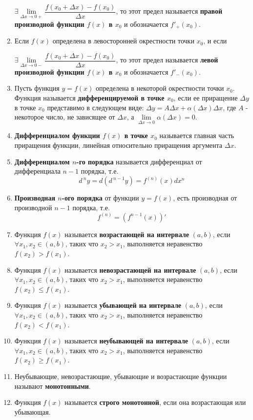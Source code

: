 \begin{enumerate}
$\exists \lim\limits_{\Delta x \to 0+}{\dfrac{f(x_0+\Delta x) - f(x_0)}{\Delta x}}$, то этот предел называется \textbf{правой производной функции $f(x)$ в $x_0$} и обозначается $f'_+(x_0)$.
\item Если $f(x)$ определена в левосторонней окрестности точки $x_0$, и если

$\exists \lim\limits_{\Delta x \to 0-}{\dfrac{f(x_0+\Delta x) - f(x_0)}{\Delta x}}$, то этот предел называется \textbf{левой производной функции $f(x)$ в $x_0$} и обозначается $f'_-(x_0)$.
\item Пусть функция $y = f(x)$ определена в некоторой окрестности точки $x_0$. Функция называется \textbf{дифференцируемой в точке $x_0$}, если ее приращение $\Delta y$ в точке $x_0$ представимо в следующем виде: $\Delta y = A\Delta x + \alpha(\Delta x)\Delta x$, где $A$ - некоторое число, не зависящее от $\Delta x$, а $\lim\limits_{\Delta x \to 0}\alpha(\Delta x) = 0$.
\item \textbf{Дифференциалом функции $f(x)$ в точке $x_0$} называется главная часть приращения функции, линейная относительно приращения аргумента $\Delta x$.
\item \textbf{Дифференциалом $n$-го порядка} называется дифференциал от дифференциала $n-1$ порядка, т.е. $$d^{\ n}y = d(d^{\ n-1}y) = f^{(n)}(x)dx^n$$
\item \textbf{Производная $n$-ого порядка} от функции $y = f(x)$, есть производная от производной $n-1$ порядка, т.е. $$f^{(n)} = (f^{n-1}(x))'$$
\item Функция $f(x)$ называется \textbf{возрастающей на интервале} $(a, b)$, если $\forall x_1, x_2 \in (a, b)$, таких что $x_2 > x_1$, выполняется неравенство $f(x_2)>f(x_1)$.
\item Функция $f(x)$ называется \textbf{невозрастающей на интервале} $(a, b)$, если $\forall x_1, x_2 \in (a, b)$, таких что $x_2 > x_1$, выполняется неравенство $f(x_2)\leqslant f(x_1)$.
\item Функция $f(x)$ называется \textbf{убывающей на интервале} $(a, b)$, если $\forall x_1, x_2 \in (a, b)$, таких что $x_2 > x_1$, выполняется неравенство $f(x_2)<f(x_1)$.
\item Функция $f(x)$ называется \textbf{неубывающей на интервале} $(a, b)$, если $\forall x_1, x_2 \in (a, b)$, таких что $x_2 > x_1$, выполняется неравенство $f(x_2)\geqslant f(x_1)$.
\item Неубывающие, невозрастающие, убывающие и возрастающие функции называют \textbf{монотонными}.
\item Функция $f(x)$ называется \textbf{строго монотонной}, если она возрастающая или убывающая.

\end{enumerate}
